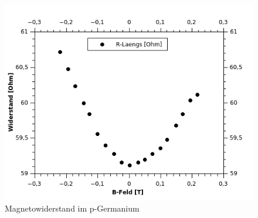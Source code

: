 \documentclass[12pt,a4paper]{article}
\begin{document}
\begin{figure}[H]
	\centering
	\includegraphics[scale=1.3]{./figures/Hall_pGe_magnetischer_Widerstand.png}
	\caption{Magnetowiderstand im p-Germanium}
	\label{fig:pGe_mag_wider}
\end{figure}
\end{document}
